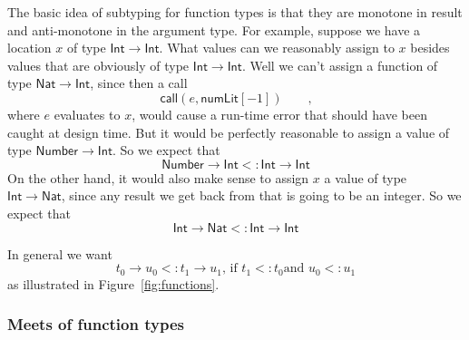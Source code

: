 \documentclass[12pt]{article}
\begin{document}
The basic idea of subtyping for function types is that they are monotone in
result and anti-monotone in the argument type. For example, suppose we have
a location $x$ of type $\mathsf{Int}\rightarrow \mathsf{Int}$. What values
can we reasonably assign to $x$ besides values that are obviously of type $%
\mathsf{Int}\rightarrow \mathsf{Int}$. Well we can't assign a function of
type $\mathsf{Nat}\rightarrow \mathsf{Int}$, since then a call%
\begin{equation*}
\mathsf{call}(e,\mathsf{numLit}[-1])\qquad \text{,}
\end{equation*}%
where $e$ evaluates to $x$, would cause a run-time error that should have
been caught at design time. But it would be perfectly reasonable to assign a
value of type $\mathsf{Number}\rightarrow \mathsf{Int}$. So we expect that%
\begin{equation*}
\mathsf{Number}\rightarrow \mathsf{Int}<:\mathsf{Int}\rightarrow \mathsf{Int}
\end{equation*}%
On the other hand, it would also make sense to assign $x$ a value of type $%
\mathsf{Int}\rightarrow \mathsf{Nat}$, since any result we get back from
that is going to be an integer. So we expect that 
\begin{equation*}
\mathsf{Int}\rightarrow \mathsf{Nat}<:\mathsf{Int}\rightarrow \mathsf{Int}
\end{equation*}

In general we want%
\begin{equation}
t_{0}\rightarrow u_{0}<:t_{1}\rightarrow u_{1}\text{, if }t_{1}<:t_{0}\text{
and }u_{0}<:u_{1}  \tag{Arrow-Subtype}
\end{equation}%
as illustrated in Figure~\ref{fig:functions}.

\subsubsection{Meets of function types}
\end{document}
